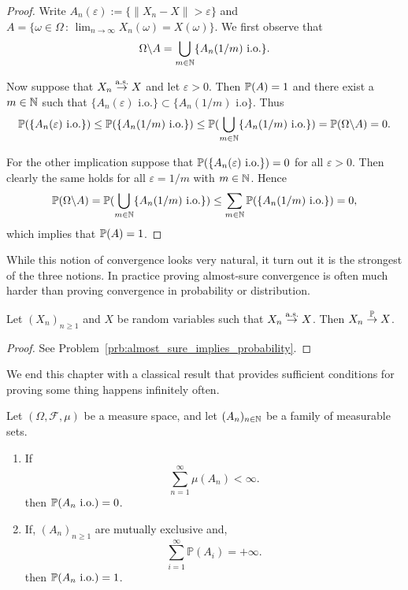 \begin{proof}
Write $A_n(\varepsilon) :=  \{\|X_n - X\| > \varepsilon\}$ and $A = \{\omega \in \Omega \, : \, \lim_{n \to \infty} X_n(\omega) = X(\omega)\}$. We first observe that
\[
	\Omega\backslash A = \bigcup_{m \in \mathbb N} \{A_n(1/m) \text{ i.o.}\}.
\]

Now suppose that $X_n \stackrel{\mathrm{a.s.}}{\rightarrow} X$ and let $\varepsilon > 0$. Then $\mathbb P(A) = 1$ and there exist a $m \in \mathbb N$ such that $\{A_n(\varepsilon) \text{ i.o.}\} \subset \{A_n(1/m) \text{ i.o}\}$. Thus
\[
	\mathbb P(\{A_n(\varepsilon) \text{ i.o.}\}) \le \mathbb P(\{A_n(1/m) \text{ i.o.}\}) \le \mathbb P(\bigcup_{m \in \mathbb N} \{A_n(1/m) \text{ i.o.}\}) = \mathbb P(\Omega \backslash A) = 0.
\]

For the other implication suppose that $\mathbb P(\{A_n(\varepsilon) \text{ i.o.}\}) = 0$ for all $\varepsilon > 0$. Then clearly the same holds for all $\varepsilon = 1/m$ with $m \in \mathbb N$. Hence
\[
	\mathbb P(\Omega\backslash A) = \mathbb P(\bigcup_{m \in \mathbb N} \{A_n(1/m) \text{ i.o.}\}) \le \sum_{m \in \mathbb N} \mathbb P(\{A_n(1/m) \text{ i.o.}\}) = 0,
\]
which implies that $\mathbb P(A) = 1$.
\end{proof}

While this notion of convergence looks very natural, it turn out it is the strongest of the three notions. In practice proving almost-sure convergence is often much harder than proving convergence in probability or distribution.

\begin{lemma}\label{lem:almost_sure_implies_probability}
Let $(X_n)_{n \ge 1}$ and $X$ be random variables such that $X_n \stackrel{\mathrm{a.s.}}{\rightarrow} X$. Then $X_n \stackrel{\mathbb P}{\rightarrow} X$.
\end{lemma}

\begin{proof}
See Problem~\ref{prb:almost_sure_implies_probability}.
\end{proof}

We end this chapter with a classical result that provides sufficient conditions for proving some thing happens infinitely often.

\begin{lemma}\label{lem:borel_cantelli}
Let $(\Omega, \mathcal{F}, \mu)$ be a measure space, and let $(A_n)_{n\in\mathbb N}$ be a family of measurable sets.
\begin{enumerate}[label={(\alph*)}]
\item If
\[
	\sum_{n=1}^\infty \mu(A_n) < \infty.
\]
then $\mathbb P(A_n \text{ i.o.}) = 0$.
\item If, $(A_n)_{n \ge 1}$ are mutually exclusive and,
\[
	\sum_{i=1}^\infty \mathbb{P}(A_i) = +\infty.
\]
then $\mathbb P(A_n \text{ i.o.}) = 1$.
\end{enumerate}
\end{lemma}

